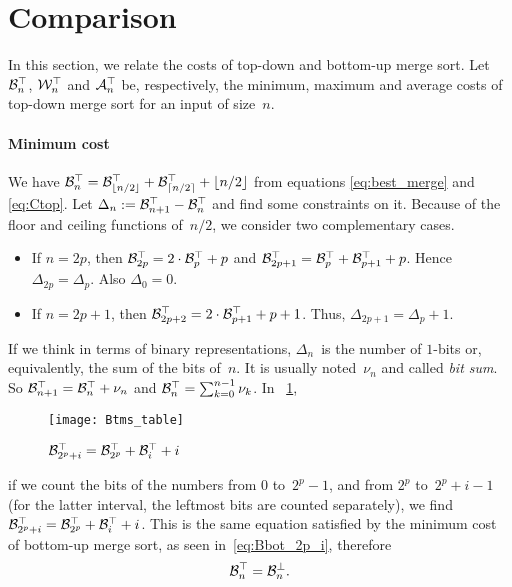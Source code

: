 \section{Comparison}

In this section, we relate the costs of top-down and bottom-up merge sort. Let \(\mathcal{B}_{n}^{\top}\), \(\mathcal{W}_{n}^{\top}\) and \(\mathcal{A}_{n}^{\top}\) be, respectively, the minimum, maximum and average costs of top-down merge sort for an input of size~\(n\). 

\paragraph{Minimum cost}

We have \(\mathcal{B}_{n}^{\top} = \mathcal{B}_{\lfloor{n/2}\rfloor}^{\top} +
\mathcal{B}_{\lceil{n/2}\rceil}^{\top} + \lfloor{n/2}\rfloor\) from equations
\eqref{eq:best_merge} and \eqref{eq:Ctop}. Let \(\Delta_n :=
\mathcal{B}_{n+1}^{\top} - \mathcal{B}_{n}^{\top}\) and find some constraints on it. Because
of the floor and ceiling functions of~\(n/2\), we consider two
complementary cases.  \begin{itemize}

  \item If \(n = 2p\), then \(\mathcal{B}_{2p}^{\top} = 2 \cdot \mathcal{B}_{p}^{\top} + p\)
    and \(\mathcal{B}_{2p+1}^{\top} = \mathcal{B}_{p}^{\top} + \mathcal{B}_{p+1}^{\top} +
    p\). Hence \(\Delta_{2p} = \Delta_{p}\). Also \(\Delta_0 =
    0\).

  \item If \(n = 2p+1\), then \(\mathcal{B}_{2p+2}^{\top} = 2 \cdot \mathcal{B}_{p+1}^{\top}
    + p + 1\). Thus, \(\Delta_{2p+1} = \Delta_{p} + 1\).

\end{itemize}
If we think in terms of binary representations, \(\Delta_n\)~is the
number of \(1\)-bits or, equivalently, the sum of the bits
of~\(n\). It is usually noted~\(\nu_n\) and called \emph{bit sum}. So
\(\mathcal{B}_{n+1}^{\top} = \mathcal{B}_{n}^{\top} + \nu_n\) and \(\mathcal{B}_{n}^{\top} =
\sum_{k=0}^{n-1}{\nu_k}\). In \fig~\ref{fig:Btms_table},
\begin{figure}
\centering
\texttt{[image: Btms\_table]}
\caption{$\protect\mathcal{B}_{2^p+i}^{\top} = \protect\mathcal{B}_{2^p}^{\top}
  + \protect\mathcal{B}_{i}^{\top} + i$\label{fig:Btms_table}}
\end{figure}
if we count the bits of the numbers from \(0\) to~\(2^p-1\), and from
\(2^p\) to~\(2^p+i-1\) (for the latter interval, the leftmost bits are
counted separately), we find \(\mathcal{B}_{2^p+i}^{\top} = \mathcal{B}_{2^p}^{\top} +
\mathcal{B}_{i}^{\top} + i\). This is the same equation satisfied by the minimum
cost of bottom-up merge sort, as seen in~\eqref{eq:Bbot_2p_i},
therefore
\begin{equation}
\mathcal{B}_{n}^{\top} = \mathcal{B}_{n}^{\bot}.
\label{eq:Btop_Bbot}
\end{equation}

